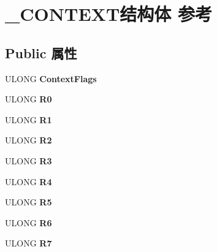 \hypertarget{struct___c_o_n_t_e_x_t}{}\section{\+\_\+\+C\+O\+N\+T\+E\+X\+T结构体 参考}
\label{struct___c_o_n_t_e_x_t}
\subsection*{Public 属性}
\begin{DoxyCompactItemize}
\item 
\mbox{\label{struct___c_o_n_t_e_x_t_a4706e8d81d1a01ef14e5309c93275810}} 
U\+L\+O\+NG {\bfseries Context\+Flags}
\item 
\mbox{\label{struct___c_o_n_t_e_x_t_a8bddade3656f45a4d191ee2446310afc}} 
U\+L\+O\+NG {\bfseries R0}
\item 
\mbox{\label{struct___c_o_n_t_e_x_t_a7e6201ae2160e9bcaa559408c9928e57}} 
U\+L\+O\+NG {\bfseries R1}
\item 
\mbox{\label{struct___c_o_n_t_e_x_t_a2d12df4d1b8a48acf0cba1d5fdc2265c}} 
U\+L\+O\+NG {\bfseries R2}
\item 
\mbox{\label{struct___c_o_n_t_e_x_t_a5b2d9fedfa93f982f91dc5e95b949fd9}} 
U\+L\+O\+NG {\bfseries R3}
\item 
\mbox{\label{struct___c_o_n_t_e_x_t_a91241a0ae8ff07f61c7038ea53661bcd}} 
U\+L\+O\+NG {\bfseries R4}
\item 
\mbox{\label{struct___c_o_n_t_e_x_t_a1cd9ae458ad50f88fd14035407b958f5}} 
U\+L\+O\+NG {\bfseries R5}
\item 
\mbox{\label{struct___c_o_n_t_e_x_t_a389a821a59ef9c17ec6271709378d808}} 
U\+L\+O\+NG {\bfseries R6}
\item 
\mbox{\label{struct___c_o_n_t_e_x_t_a32f1a1d4fd12fcbb577d9fc8601dc7a4}} 
U\+L\+O\+NG {\bfseries R7}
\item 

\end{DoxyCompactItemize}
